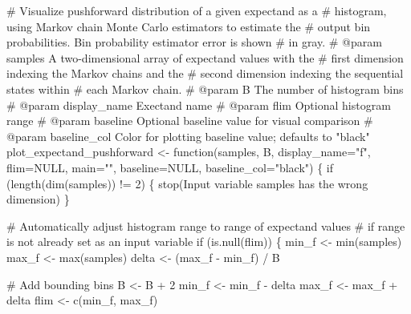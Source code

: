 \documentclass[
  letterpaper,
  DIV=11,
  numbers=noendperiod]{scrartcl}
\newenvironment{Shaded}{\begin{snugshade}}{\end{snugshade}}
\newcommand{\BuiltInTok}[1]{\textcolor[rgb]{0.00,0.23,0.31}{#1}}
\newcommand{\CommentTok}[1]{\textcolor[rgb]{0.37,0.37,0.37}{#1}}
\newcommand{\ControlFlowTok}[1]{\textcolor[rgb]{0.00,0.23,0.31}{#1}}
\newcommand{\DecValTok}[1]{\textcolor[rgb]{0.68,0.00,0.00}{#1}}
\newcommand{\KeywordTok}[1]{\textcolor[rgb]{0.00,0.23,0.31}{#1}}
\newcommand{\NormalTok}[1]{\textcolor[rgb]{0.00,0.23,0.31}{#1}}
\newcommand{\OperatorTok}[1]{\textcolor[rgb]{0.37,0.37,0.37}{#1}}
\newcommand{\StringTok}[1]{\textcolor[rgb]{0.13,0.47,0.30}{#1}}
\begin{document}
\begin{Shaded}
\begin{Highlighting}[]
\CommentTok{\# Visualize pushforward distribution of a given expectand as a }
\CommentTok{\# histogram, using Markov chain Monte Carlo estimators to estimate the }
\CommentTok{\# output bin probabilities.  Bin probability estimator error is shown }
\CommentTok{\# in gray.}
\CommentTok{\# @param samples A two{-}dimensional array of expectand values with the }
\CommentTok{\#                first dimension indexing the Markov chains and the }
\CommentTok{\#                second dimension indexing the sequential states within }
\CommentTok{\#                each Markov chain.}
\CommentTok{\# @param B The number of histogram bins}
\CommentTok{\# @param display\_name Exectand name}
\CommentTok{\# @param flim Optional histogram range}
\CommentTok{\# @param baseline Optional baseline value for visual comparison}
\CommentTok{\# @param baseline\_col Color for plotting baseline value; defaults to "black"}
\NormalTok{plot\_expectand\_pushforward }\OperatorTok{\textless{}{-}}\NormalTok{ function(samples, B, display\_name}\OperatorTok{=}\StringTok{"f"}\NormalTok{,}
\NormalTok{                                       flim}\OperatorTok{=}\NormalTok{NULL, main}\OperatorTok{=}\StringTok{""}\NormalTok{, }
\NormalTok{                                       baseline}\OperatorTok{=}\NormalTok{NULL, baseline\_col}\OperatorTok{=}\StringTok{"black"}\NormalTok{) \{}
  \ControlFlowTok{if}\NormalTok{ (length(dim(samples)) }\OperatorTok{!=} \DecValTok{2}\NormalTok{) \{}
\NormalTok{    stop(}\StringTok{\textquotesingle{}Input variable \textasciigrave{}samples\textasciigrave{} has the wrong dimension\textquotesingle{}}\NormalTok{)}
\NormalTok{  \}}
  
  \CommentTok{\# Automatically adjust histogram range to range of expectand values}
  \CommentTok{\# if range is not already set as an input variable}
  \ControlFlowTok{if}\NormalTok{ (}\KeywordTok{is}\NormalTok{.null(flim)) \{}
\NormalTok{    min\_f }\OperatorTok{\textless{}{-}} \BuiltInTok{min}\NormalTok{(samples)}
\NormalTok{    max\_f }\OperatorTok{\textless{}{-}} \BuiltInTok{max}\NormalTok{(samples)}
\NormalTok{    delta }\OperatorTok{\textless{}{-}}\NormalTok{ (max\_f }\OperatorTok{{-}}\NormalTok{ min\_f) }\OperatorTok{/}\NormalTok{ B}
    
    \CommentTok{\# Add bounding bins}
\NormalTok{    B }\OperatorTok{\textless{}{-}}\NormalTok{ B }\OperatorTok{+} \DecValTok{2}
\NormalTok{    min\_f }\OperatorTok{\textless{}{-}}\NormalTok{ min\_f }\OperatorTok{{-}}\NormalTok{ delta}
\NormalTok{    max\_f }\OperatorTok{\textless{}{-}}\NormalTok{ max\_f }\OperatorTok{+}\NormalTok{ delta}
\NormalTok{    flim }\OperatorTok{\textless{}{-}}\NormalTok{ c(min\_f, max\_f)}
    

\end{Highlighting}
\end{Shaded}
\end{document}
